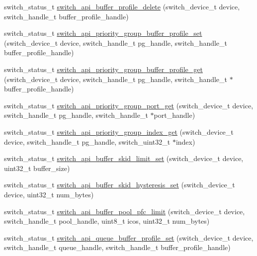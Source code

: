 \begin{DoxyCompactItemize}
\item 
switch\+\_\+status\+\_\+t \hyperlink{group__Buffer_ga952bf3d688f1bcf28ef67d92df1863df}{switch\+\_\+api\+\_\+buffer\+\_\+profile\+\_\+delete} (switch\+\_\+device\+\_\+t device, switch\+\_\+handle\+\_\+t buffer\+\_\+profile\+\_\+handle)
\item 
switch\+\_\+status\+\_\+t \hyperlink{group__Buffer_ga4a4271c9bff789056b38f18a0da55b21}{switch\+\_\+api\+\_\+priority\+\_\+group\+\_\+buffer\+\_\+profile\+\_\+set} (switch\+\_\+device\+\_\+t device, switch\+\_\+handle\+\_\+t pg\+\_\+handle, switch\+\_\+handle\+\_\+t buffer\+\_\+profile\+\_\+handle)
\item 
switch\+\_\+status\+\_\+t \hyperlink{group__Buffer_gabab914c738583b59c2efda39d6dc5eb3}{switch\+\_\+api\+\_\+priority\+\_\+group\+\_\+buffer\+\_\+profile\+\_\+get} (switch\+\_\+device\+\_\+t device, switch\+\_\+handle\+\_\+t pg\+\_\+handle, switch\+\_\+handle\+\_\+t $\ast$buffer\+\_\+profile\+\_\+handle)
\item 
switch\+\_\+status\+\_\+t \hyperlink{group__Buffer_ga4ee3d6d74a5cf69b8e44d0cdaf500e54}{switch\+\_\+api\+\_\+priority\+\_\+group\+\_\+port\+\_\+get} (switch\+\_\+device\+\_\+t device, switch\+\_\+handle\+\_\+t pg\+\_\+handle, switch\+\_\+handle\+\_\+t $\ast$port\+\_\+handle)
\item 
switch\+\_\+status\+\_\+t \hyperlink{group__Buffer_ga60c89b499c765f68312ff16e58b8f888}{switch\+\_\+api\+\_\+priority\+\_\+group\+\_\+index\+\_\+get} (switch\+\_\+device\+\_\+t device, switch\+\_\+handle\+\_\+t pg\+\_\+handle, switch\+\_\+uint32\+\_\+t $\ast$index)
\item 
switch\+\_\+status\+\_\+t \hyperlink{group__Buffer_ga232a254bbcacdd89446a5f5289c5f398}{switch\+\_\+api\+\_\+buffer\+\_\+skid\+\_\+limit\+\_\+set} (switch\+\_\+device\+\_\+t device, uint32\+\_\+t buffer\+\_\+size)
\item 
switch\+\_\+status\+\_\+t \hyperlink{group__Buffer_ga201f5e0ed09f5eda5dfd8de258a80485}{switch\+\_\+api\+\_\+buffer\+\_\+skid\+\_\+hysteresis\+\_\+set} (switch\+\_\+device\+\_\+t device, uint32\+\_\+t num\+\_\+bytes)
\item 
switch\+\_\+status\+\_\+t \hyperlink{group__Buffer_ga47f891acb892da1948951ffee3710a7f}{switch\+\_\+api\+\_\+buffer\+\_\+pool\+\_\+pfc\+\_\+limit} (switch\+\_\+device\+\_\+t device, switch\+\_\+handle\+\_\+t pool\+\_\+handle, uint8\+\_\+t icos, uint32\+\_\+t num\+\_\+bytes)
\item 
switch\+\_\+status\+\_\+t \hyperlink{group__Buffer_ga68dd04b8e490735cd3f50c2156a0e98e}{switch\+\_\+api\+\_\+queue\+\_\+buffer\+\_\+profile\+\_\+set} (switch\+\_\+device\+\_\+t device, switch\+\_\+handle\+\_\+t queue\+\_\+handle, switch\+\_\+handle\+\_\+t buffer\+\_\+profile\+\_\+handle)

\end{DoxyCompactItemize}
